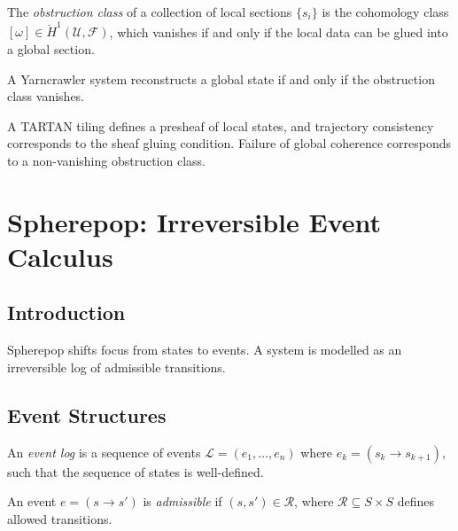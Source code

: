 \documentclass[11pt,openany]{book}
\begin{document}
\begin{definition}
The \emph{obstruction class} of a collection of local
sections $\{s_i\}$ is the cohomology class
$[\omega] \in \check{H}^1(\mathcal{U}, \mathcal{F})$,
which vanishes if and only if the local data can be glued
into a global section.
\end{definition}

\begin{proposition}
\label{prop:reconstruction}
A Yarncrawler system reconstructs a global state if and
only if the obstruction class vanishes.
\end{proposition}

\begin{proposition}
\label{prop:tartan-yarn}
A TARTAN tiling defines a presheaf of local states, and
trajectory consistency corresponds to the sheaf gluing
condition. Failure of global coherence corresponds to a
non-vanishing obstruction class.
\end{proposition}


\chapter{Spherepop: Irreversible Event Calculus}
\label{ch:spherepop}

\section{Introduction}
\label{sec:introduction-spherepop}

Spherepop shifts focus from states to events. A system is
modelled as an irreversible log of admissible transitions.

\section{Event Structures}
\label{sec:event-structures}

\begin{definition}
\label{def:log}
An \emph{event log} is a sequence of events
$\mathcal{L} = (e_1, \ldots, e_n)$ where $e_k = (s_k \to
s_{k+1})$, such that the sequence of states is well-defined.
\end{definition}

\begin{definition}
\label{def:admissible-event}
An event $e = (s \to s')$ is \emph{admissible} if
$(s, s') \in \mathcal{R}$, where $\mathcal{R} \subseteq
S \times S$ defines allowed transitions.
\end{definition}
\end{document}
